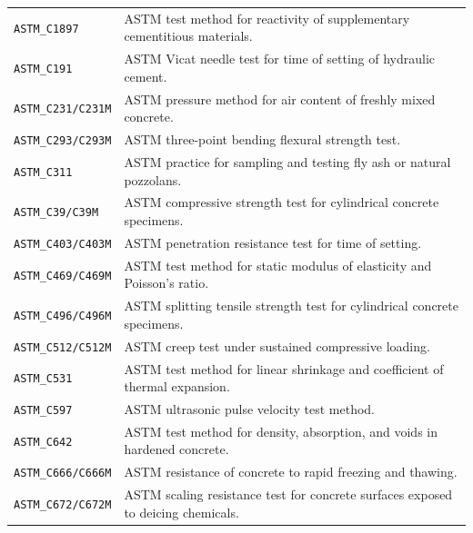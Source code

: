 \documentclass[11pt]{book}
\begin{document}
{\begin{longtable}{p{}p{}}
\texttt{ASTM\_C1897} &
ASTM test method for reactivity of supplementary cementitious materials. \\

\texttt{ASTM\_C191} &
ASTM Vicat needle test for time of setting of hydraulic cement. \\

\texttt{ASTM\_C231/C231M} &
ASTM pressure method for air content of freshly mixed concrete. \\

\texttt{ASTM\_C293/C293M} &
ASTM three-point bending flexural strength test. \\

\texttt{ASTM\_C311} &
ASTM practice for sampling and testing fly ash or natural pozzolans. \\

\texttt{ASTM\_C39/C39M} &
ASTM compressive strength test for cylindrical concrete specimens. \\

\texttt{ASTM\_C403/C403M} &
ASTM penetration resistance test for time of setting. \\

\texttt{ASTM\_C469/C469M} &
ASTM test method for static modulus of elasticity and Poisson's ratio. \\

\texttt{ASTM\_C496/C496M} &
ASTM splitting tensile strength test for cylindrical concrete specimens. \\

\texttt{ASTM\_C512/C512M} &
ASTM creep test under sustained compressive loading. \\

\texttt{ASTM\_C531} &
ASTM test method for linear shrinkage and coefficient of thermal expansion. \\

\texttt{ASTM\_C597} &
ASTM ultrasonic pulse velocity test method. \\

\texttt{ASTM\_C642} &
ASTM test method for density, absorption, and voids in hardened concrete. \\

\texttt{ASTM\_C666/C666M} &
ASTM resistance of concrete to rapid freezing and thawing. \\

\texttt{ASTM\_C672/C672M} &
ASTM scaling resistance test for concrete surfaces exposed to deicing chemicals. \\


\end{longtable}}
\end{document}

